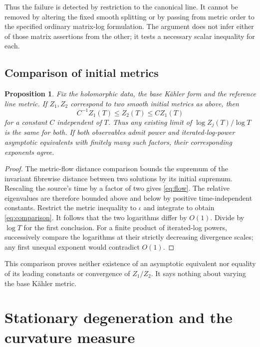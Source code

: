 \documentclass[11pt]{amsart}
\newtheorem{proposition}[theorem]{Proposition}
\theoremstyle{definition}
\theoremstyle{remark}
\begin{document}
Thus the failure is detected by restriction to the canonical line. It
cannot be removed by altering the fixed smooth splitting or by passing
from metric order to the specified ordinary matrix-log formulation.
The argument does not infer either of those matrix assertions from the
other; it tests a necessary scalar inequality for each.

\subsection{Comparison of initial metrics}
\begin{proposition}\label{prop:initial}
Fix the holomorphic data, the base K\"ahler form and the reference line
metric. If $Z_1,Z_2$ correspond to two smooth initial
metrics as above, then
\begin{equation}\label{eq:comparison}
C^{-1}Z_1(T)\le Z_2(T)\le CZ_1(T)
\end{equation}
for a constant $C$ independent of $T$. Thus any existing limit of
$\log Z_j(T)/\log T$ is the same for both. If both observables
admit power and iterated-log-power asymptotic equivalents with finitely
many such factors, their corresponding exponents agree.
\end{proposition}

\begin{proof}
The metric-flow distance comparison
\cite[Lemma~6.4.5, pp.~190--191]{kobayashi1987} bounds the supremum of the
invariant fibrewise distance between two solutions by its initial
supremum. Rescaling the source's time by a factor of two gives
\eqref{eq:flow}. The relative eigenvalues are therefore bounded above
and below by positive time-independent constants. Restrict the metric
inequality to $\iota$ and integrate to obtain \eqref{eq:comparison}.
It follows that the two logarithms differ by $O(1)$. Divide by $\log T$
for the first conclusion. For a finite product of iterated-log powers,
successively compare the logarithms at their strictly decreasing
divergence scales; any first unequal exponent would contradict $O(1)$.
\end{proof}

This comparison proves neither existence of an asymptotic equivalent
nor equality of its leading constants or convergence of
$Z_1/Z_2$. It says nothing about varying the base
K\"ahler metric.


\section{Stationary degeneration and the curvature measure}\label{sec:stationary}
\end{document}
